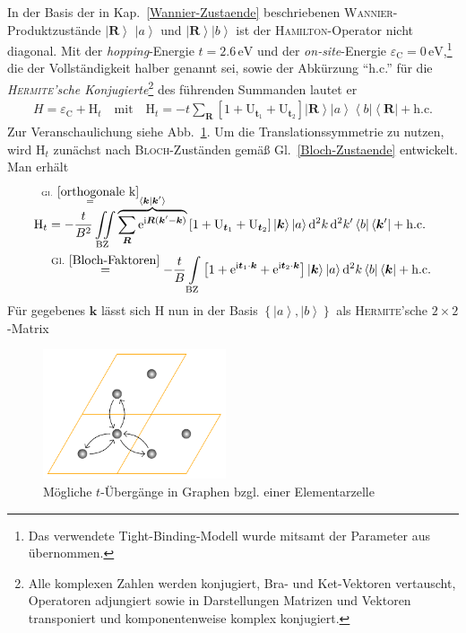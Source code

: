 \documentclass[a4paper, 10pt, twoside, openany]{book} %
\newcommand \bra[1]{\left \langle #1 \right |}
\newcommand \ket[1]{\left | #1 \right \rangle}
\newcommand \bracket[2]{\left \langle #1 \middle | #2 \right \rangle}
\newcommand \bracks[1]{\left [ #1 \right ]}
\newcommand \braces[1]{\left \lbrace #1 \right \rbrace}
\def \I {\mathrm i}
\def \E {\mathrm e}
\def \vec {\boldsymbol}
\newcommand \op[1]{\mathrm{#1}}
\def \eC {\varepsilon_\mathrm{C}}
\begin{document}
    In der Basis der in Kap.~\ref{Wannier-Zustaende} beschriebenen \textsc{Wannier}-Produktzustände $\ket{\vec R}$ $\ket a$ und $\ket{\vec R} \ket b$ ist der \textsc{Hamilton}-Operator nicht diagonal. Mit der \emph{hopping}-Energie $t = 2.6\,\mathrm{eV}$ und der \emph{on-site}-Energie $\eC = 0\,\mathrm{eV}$,\footnote{Das verwendete Tight-Binding-Modell wurde mitsamt der Parameter aus \cite[S.~2]{Wehling2} übernommen.} die der Vollständigkeit halber genannt sei, sowie der Abkürzung "`h.c."' für die \emph{\textsc{Hermite}'sche Konjugierte}\footnote{Alle komplexen Zahlen werden konjugiert, Bra- und Ket-Vektoren vertauscht, Operatoren adjungiert sowie in Darstellungen Matrizen und Vektoren transponiert und komponentenweise komplex konjugiert.} des führenden Summanden lautet er
	\begin{align}
		H = \eC + \op H_t \quad \text{mit} \quad \op H_t = -t \sum_{\vec R} \bracks{1 + \op U_{\vec t_1} + \op U_{\vec t_2}} \ket{\vec R} \ket a \bra b \bra{\vec R} + \text{h.c.}
		\label{Hamiltonian Graphen}
	\end{align}
    Zur Veranschaulichung siehe Abb.~\ref{Uebergaenge Graphen}. Um die Translationssymmetrie zu nutzen, wird $\op H_t$ zunächst nach \textsc{Bloch}-Zuständen gemäß Gl.~\ref{Bloch-Zustaende} entwickelt. Man erhält
	\begin{align*}
		\op H_t &= -\frac t {B^2} \iint \limits_{\rm BZ} \overbrace{\sum_{\vec R} \E^{\I \vec R (\vec k' - \vec k)}}^{\mathllap{\overset{\rm Gl.~\ref{orthogonale k}} =} \bracket{\vec k}{\vec k\smash'}} \bracks{1 + \op U_{\vec t_1} + \op U_{\vec t_2}} \ket{\vec k} \ket a \mathrm d^2 k \, \mathrm d^2 k' \bra b \bra{\vec k \smash '} + \text{h.c.} \\
		& \overset {\rm Gl.~\ref{Bloch-Faktoren}} = -\frac t B \int \limits_{\rm BZ} \bracks{1 + \E^{\I \vec t_1 \cdot \vec k} + \E^{\I \vec t_2 \cdot \vec k}} \ket{\vec k} \ket a \mathrm d^2 k \bra b \bra{\vec k} + \text{h.c.}
	\end{align*}
    Für gegebenes $\vec k$ lässt sich $\op H$ nun in der Basis $\braces{\ket a, \ket b}$ als \textsc{Hermite}'sche $2 \times 2$-Matrix
	\begin{figure}
		\centering
		\includegraphics[width=0.48\textwidth]{Abbildungen/Raumstrukturen/Graphen.pdf}
		\caption{Mögliche $t$-Übergänge in Graphen bzgl. einer Elementarzelle}
		\label{Uebergaenge Graphen}
	\end{figure}
\end{document}
